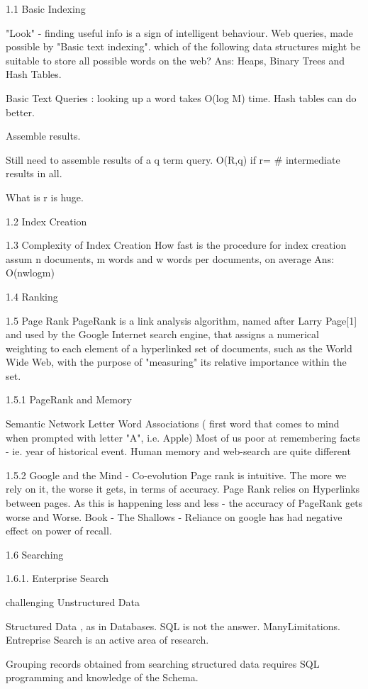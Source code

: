 1.1 Basic Indexing

"Look"  - finding useful info is a sign of intelligent behaviour.
Web queries, made possible by "Basic text indexing".
which of the following data structures might be suitable to store all possible words on the web?
Ans: Heaps, Binary Trees and Hash Tables.

Basic Text Queries : looking up a word takes O(log M) time. 
Hash tables can do better.

Assemble results.

Still need to assemble results of a q term query.
O(R,q) if r= # intermediate results in all.

What is r is huge.


1.2 Index Creation

1.3 Complexity of Index Creation
How fast is the procedure for index creation
assum n documents, m words and w words per documents, on average
Ans: O(nwlogm)

1.4 Ranking

1.5 Page Rank
PageRank is a link analysis algorithm, named after Larry Page[1] and used by the Google Internet search engine, that assigns a numerical weighting to each element of a hyperlinked set of documents, such as the World Wide Web, with the purpose of "measuring" its relative importance within the set.

1.5.1 PageRank and Memory

Semantic Network
Letter Word Associations ( first word that comes to mind when prompted with letter "A", i.e. Apple)
Most of us poor at remembering facts - ie. year of historical event.
Human memory and web-search are quite different

1.5.2 Google and the Mind - Co-evolution
Page rank is intuitive. The more we rely on it, the worse it gets, in terms of accuracy.
Page Rank relies on Hyperlinks between pages. As this is happening less and less - the accuracy of PageRank gets worse and Worse.
Book - The Shallows - Reliance on google has had negative effect on power of recall.

1.6 Searching

1.6.1. Enterprise Search

challenging
Unstructured Data

Structured Data , as in Databases.
SQL is not the answer. ManyLimitations.
Entreprise Search is an active area of research.

Grouping records obtained from searching structured data requires SQL programming and knowledge of the Schema.

